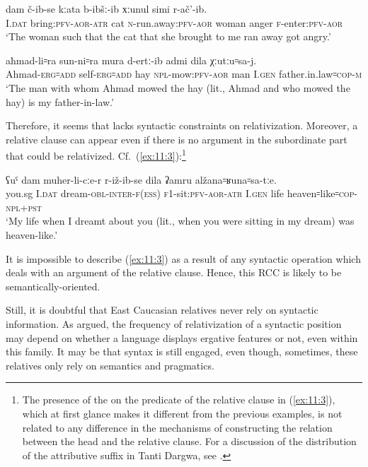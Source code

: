 ﻿\documentclass[output=paper]{langsci/langscibook}
\begin{document}
\ea %
\gll dam č-ib-se kːata b-ibšː-ib хːunul simi r-ač'-ib.\\
  I.\textsc{dat} bring:\textsc{pfv}-\textsc{aor}-\textsc{atr} cat  \textsc{n}-run.away:\textsc{pfv}-\textsc{aor} woman anger \textsc{f}-enter:\textsc{pfv}-\textsc{aor}\\
\glt `The woman such that the cat that she brought to me ran away got angry.'

\ex \label{ex:11:2} %
\gll  aħmad-li꞊ra sun-ni꞊ra mura d-ertː-ib admi dila χːutːu꞊sa-j.\\
Ahmad-\textsc{erg}꞊\textsc{add} self-\textsc{erg}꞊\textsc{add} hay \textsc{npl}-mow:\textsc{pfv}-\textsc{aor} man I.\textsc{gen} father.in.law꞊\textsc{cop}-\textsc{m}\\
\glt `The man with whom Ahmad mowed the hay (lit., Ahmad and who mowed the
hay) is my father-in-law.'
\z

Therefore, it seems that  lacks syntactic constraints on
relativization. Moreover, a relative clause can appear even if there is
no argument in the subordinate part that could be relativized. Cf.\
(\ref{ex:11:3}):\footnote{The presence of the  on the predicate of
  the relative clause in (\ref{ex:11:3}), which at first glance makes it different
  from the previous examples, is not related to any difference in the
  mechanisms of constructing the relation between the head and the
  relative clause. For a discussion of the distribution of the
  attributive suffix in Tanti Dargwa, see \citet{lander2014}.}

\ea \label{ex:11:3} %
\gll  ʕuˤ dam muher-li-cːe-r r-iž-ib-se dila ʡamru alžana꞊ʁuna꞊sa-tːe.\\
you.sg I.\textsc{dat} dream-\textsc{obl}-\textsc{inter}-\textsc{f}(\textsc{ess}) \textsc{f1}-sit:\textsc{pfv}-\textsc{aor}-\textsc{atr} I.\textsc{gen} life heaven꞊like꞊\textsc{cop}-\textsc{npl}+\textsc{pst}\\
\glt `My life when I dreamt about you (lit., when you were sitting in my
dream) was heaven-like.'
\z

It is impossible to describe (\ref{ex:11:3}) as a result of any syntactic operation
which deals with an argument of the relative clause. Hence, this RCC is
likely to be semantically-oriented.


Still, it is doubtful that East Caucasian relatives never rely on
syntactic information. As \citet{daniel-lander2013} argued, the frequency
of relativization of a syntactic position may depend on whether a
language displays ergative features or not, even within this family. It
may be that syntax is still engaged, even though, sometimes, these
relatives only rely on semantics and pragmatics.
\end{document}
